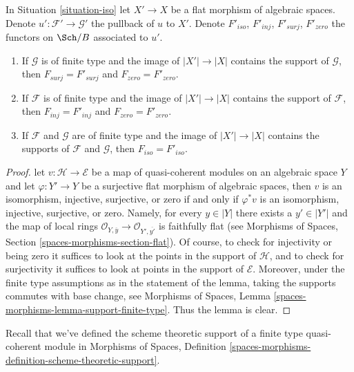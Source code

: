 \begin{lemma}
\label{lemma-iso-go-up}
In Situation \ref{situation-iso} let $X' \to X$ be a flat morphism
of algebraic spaces. Denote $u' : \mathcal{F}' \to \mathcal{G}'$
the pullback of $u$ to $X'$. Denote $F'_{iso}$, $F'_{inj}$, $F'_{surj}$,
$F'_{zero}$ the functors on $\Sch/B$ associated to $u'$.
\begin{enumerate}
\item If $\mathcal{G}$ is of finite type and the image of $|X'| \to |X|$
contains the support of $\mathcal{G}$, then $F_{surj} = F'_{surj}$
and $F_{zero} = F'_{zero}$.
\item If $\mathcal{F}$ is of finite type and the image of $|X'| \to |X|$
contains the support of $\mathcal{F}$, then $F_{inj} = F'_{inj}$
and $F_{zero} = F'_{zero}$.
\item If $\mathcal{F}$ and $\mathcal{G}$ are of finite type and the image of
$|X'| \to |X|$ contains the supports of $\mathcal{F}$ and $\mathcal{G}$,
then $F_{iso} = F'_{iso}$.
\end{enumerate}
\end{lemma}

\begin{proof}
let $v : \mathcal{H} \to \mathcal{E}$ be a map of quasi-coherent
modules on an algebraic space $Y$ and let $\varphi : Y' \to Y$ be a
surjective flat morphism of algebraic spaces, then $v$ is
an isomorphism, injective, surjective, or zero if and only if $\varphi^*v$ is
an isomorphism, injective, surjective, or zero. Namely,
for every $y \in |Y|$ there exists a $y' \in |Y'|$ and the map
of local rings
$\mathcal{O}_{Y, \overline{y}} \to \mathcal{O}_{Y', \overline{y'}}$
is faithfully flat (see
Morphisms of Spaces, Section \ref{spaces-morphisms-section-flat}).
Of course, to check for injectivity or being zero it suffices to look
at the points in the support of $\mathcal{H}$, and to check for
surjectivity it suffices to look at points in the support of $\mathcal{E}$.
Moreover, under the finite type assumptions as in the statement of
the lemma, taking the supports commutes with base change, see
Morphisms of Spaces, Lemma \ref{spaces-morphisms-lemma-support-finite-type}.
Thus the lemma is clear.
\end{proof}

\noindent
Recall that we've defined the scheme theoretic support of a finite
type quasi-coherent module in Morphisms of Spaces, Definition
\ref{spaces-morphisms-definition-scheme-theoretic-support}.

